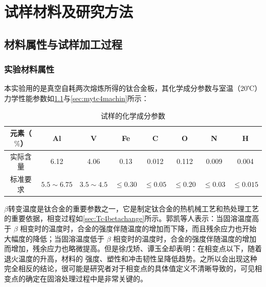 \chapter{试样材料及研究方法}
\section{材料属性与试样加工过程}
\subsection{实验材料属性}
本实验用的是真空自耗两次熔炼所得的钛合金板，其化学成分参数与室温（20℃）力学性能参数如\ref{sec:mytc4chem}与\ref{sec:mytc4machin}所示：
\begin{table}[htbp]
	\centering
	\caption{试样的化学成分参数}
	\label{sec:mytc4chem}
	\begin{tabular}{cccccccc}
		\toprule
		元素（$ \% $） & Al & V &Fe &C& O& N &H \\ \midrule
		实际含量 & 6.12&4.06 &0.13 &0.012&0.112&0.009&0.004  \\
		标准要求 &$ 5.5\sim 6.75 $ & $ 3.5\sim 4.5 $&$ \le 0.30 $ & $ \le 0.05 $&$ \le 0.20 $&$ \le 0.03$ &$ \le 0.015 $ \\ \bottomrule
	\end{tabular}
\end{table}

$\beta$转变温度是钛合金的重要参数之一，它是制定钛合金的热机械工艺和热处理工艺的重要依据，相变过程如\ref{sec:Tc4betachange}所示。郭凯\cite{guokaiTC4taihejinrechuligongyideyanjiuxianzhuangjijinzhan2021}等人表示：当固溶温度高于 $\beta$ 相变时的温度时，合金的强度伴随温度的增加而下降，而且残余应力也开始大幅度的降低；当固溶温度低于 $\beta$ 相变时的温度时，合金的强度伴随温度的增加而增加，残余应力也略微提高。但是徐戊矫、谭玉全\cite{xujianGurongshixiaogongyiduiTC4taihejinzuzhijixingnengdeyingxiang2014}却表明：在相变点以下，随着退火温度的升高，材料的 强度、塑性和冲击韧性呈降低趋势。之所以会出现这种完全相反的结论，很可能是研究者对于相变点的具体值定义不清晰导致的，可见相变点的确定在固溶处理过程中是非常关键的。

